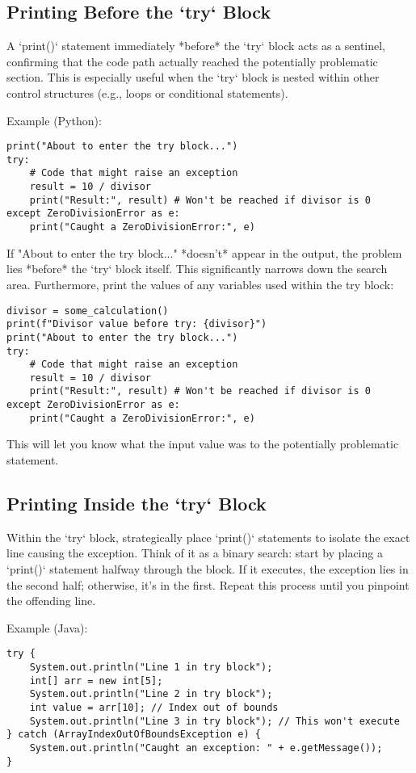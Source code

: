\documentclass{article}
\begin{document}
{{{\subsection*{Printing Before the `try` Block}

A `print()` statement immediately *before* the `try` block acts as a sentinel, confirming that the code path actually reached the potentially problematic section. This is especially useful when the `try` block is nested within other control structures (e.g., loops or conditional statements).

Example (Python):

\begin{verbatim}
print("About to enter the try block...")
try:
    # Code that might raise an exception
    result = 10 / divisor
    print("Result:", result) # Won't be reached if divisor is 0
except ZeroDivisionError as e:
    print("Caught a ZeroDivisionError:", e)
\end{verbatim}

If "About to enter the try block..." *doesn't* appear in the output, the problem lies *before* the `try` block itself. This significantly narrows down the search area. Furthermore, print the values of any variables used within the try block:
\begin{verbatim}
divisor = some_calculation()
print(f"Divisor value before try: {divisor}")
print("About to enter the try block...")
try:
    # Code that might raise an exception
    result = 10 / divisor
    print("Result:", result) # Won't be reached if divisor is 0
except ZeroDivisionError as e:
    print("Caught a ZeroDivisionError:", e)
\end{verbatim}
This will let you know what the input value was to the potentially problematic statement.

\subsection*{Printing Inside the `try` Block}

Within the `try` block, strategically place `print()` statements to isolate the exact line causing the exception. Think of it as a binary search: start by placing a `print()` statement halfway through the block. If it executes, the exception lies in the second half; otherwise, it's in the first. Repeat this process until you pinpoint the offending line.

Example (Java):

\begin{verbatim}
try {
    System.out.println("Line 1 in try block");
    int[] arr = new int[5];
    System.out.println("Line 2 in try block");
    int value = arr[10]; // Index out of bounds
    System.out.println("Line 3 in try block"); // This won't execute
} catch (ArrayIndexOutOfBoundsException e) {
    System.out.println("Caught an exception: " + e.getMessage());
}
\end{verbatim}

}}}
\end{document}
